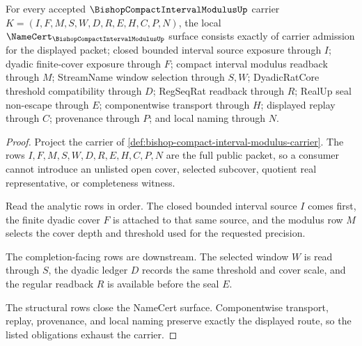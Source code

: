 \begin{theorem}
\label{thm:bishop-compact-interval-modulus-obligations}
For every accepted $\BishopCompactIntervalModulusUp$ carrier $K=(I,F,M,S,W,D,R,E,H,C,P,N)$, the local $\NameCert_{\BishopCompactIntervalModulusUp}$ surface consists exactly of carrier admission for the displayed packet; closed bounded interval source exposure through $I$; dyadic finite-cover exposure through $F$; compact interval modulus readback through $M$; StreamName window selection through $S,W$; DyadicRatCore threshold compatibility through $D$; RegSeqRat readback through $R$; RealUp seal non-escape through $E$; componentwise transport through $H$; displayed replay through $C$; provenance through $P$; and local naming through $N$.
\end{theorem}
\begin{proof}
Project the carrier of \autoref{def:bishop-compact-interval-modulus-carrier}. The rows $I,F,M,S,W,D,R,E,H,C,P,N$ are the full public packet, so a consumer cannot introduce an unlisted open cover, selected subcover, quotient real representative, or completeness witness.

Read the analytic rows in order. The closed bounded interval source $I$ comes first, the finite dyadic cover $F$ is attached to that same source, and the modulus row $M$ selects the cover depth and threshold used for the requested precision.

The completion-facing rows are downstream. The selected window $W$ is read through $S$, the dyadic ledger $D$ records the same threshold and cover scale, and the regular readback $R$ is available before the seal $E$.

The structural rows close the NameCert surface. Componentwise transport, replay, provenance, and local naming preserve exactly the displayed route, so the listed obligations exhaust the carrier.
\end{proof}

